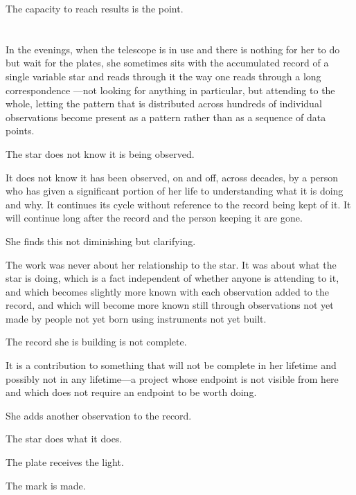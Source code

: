 The capacity to reach results is the point.

\section{}

In the evenings, when the telescope is in use
and there is nothing for her to do but wait for
the plates, she sometimes sits with the accumulated
record of a single variable star and reads through
it the way one reads through a long correspondence
---not looking for anything in particular, but
attending to the whole, letting the pattern that
is distributed across hundreds of individual
observations become present as a pattern rather
than as a sequence of data points.

The star does not know it is being observed.

It does not know it has been observed, on and
off, across decades, by a person who has given
a significant portion of her life to understanding
what it is doing and why. It continues its cycle
without reference to the record being kept of it.
It will continue long after the record and the
person keeping it are gone.

She finds this not diminishing but clarifying.

The work was never about her relationship to
the star. It was about what the star is doing,
which is a fact independent of whether anyone
is attending to it, and which becomes slightly
more known with each observation added to the
record, and which will become more known still
through observations not yet made by people
not yet born using instruments not yet built.

The record she is building is not complete.

It is a contribution to something that will
not be complete in her lifetime and possibly
not in any lifetime---a project whose endpoint
is not visible from here and which does not
require an endpoint to be worth doing.

She adds another observation to the record.

The star does what it does.

The plate receives the light.

The mark is made.

